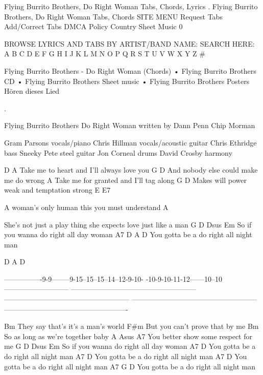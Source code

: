 
Flying Burrito Brothers, Do Right Woman Tabs, Chords, Lyrics 		
.
Flying Burrito Brothers, Do Right Woman Tabs, Chords
 SITE MENU
 Request Tabs
 Add/Correct Tabs
 DMCA Policy
 Country Sheet Music
0


	
	
BROWSE LYRICS AND TABS BY ARTIST/BAND NAME: 	SEARCH HERE:
A B C D E F G H I J K L M N O P Q R S T U V W X Y Z # 	 
	
Flying Burrito Brothers - Do Right Woman (Chords)
• Flying Burrito Brothers CD
• Flying Burrito Brothers Sheet music
• Flying Burrito Brothers Posters 	
	Hören dieses Lied 			
	
.


Flying Burrito Brothers   Do Right Woman  written by  Dann Penn
                                                      Chip Morman   
                                                                   

Gram Parsons     vocals/piano
Chris Hillman    vocals/acoustic guitar
Chris Ethridge   bass
Sneeky Pete      steel guitar
Jon Corneal      drums
David Crosby     harmony

D                                A
Take me to heart and I'll always love you
      G                          D   
And nobody else could make me do wrong    
                                     A
Take me for granted and I'll tag  along
                 G                   D
Makes will power weak and temptation strong 
E                                        E7

A woman's only human this you must understand 
A

She's not just a play thing she expects love just like a man 
                G  D     Dsus    Em
So if you wanna do right all day woman   
               A7                  D       A   D
You gotta be a do right all night man 

D               A                                  D

----------------9-9--------9-15--15--15--14--12-9-10-
-10-9-10-11-12------10--10---------------------------
-----------------------------------------------------
-----------------------------------------------------
-----------------------------------------------------
----------------------------------------------------

Bm
They say that's it's a man's world 
F#m
But you can't prove that by me
Bm                                                                
So as long as we're together baby 
           A    Asus             A7
You better show some respect  for me
                G  D     Dsus    Em
So if you wanna do right all day woman   
               A7                 D     
You gotta be a do right all night man 
               A7                 D
You gotta be a do right all night man 
               A7                 D
You gotta be a do right all night man 
               A7                 G      D
You gotta be a do right all night man

